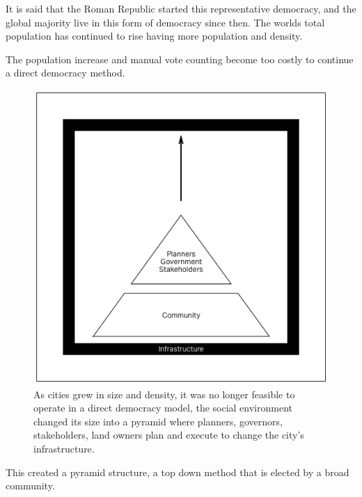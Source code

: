 
It is said that the Roman Republic started this representative
democracy, and the global majority live in this form of democracy
since then. The worlds total population has continued to rise having
more population and density.

The population increase and manual vote counting become too costly to continue a direct democracy method.

\begin{figure}[!htb]
  \includegraphics[width=\textwidth]{chapters/2/fig/representative.png}               
  \caption[representative democracy]{As cities grew in size and density, it
    was no longer feasible to operate in a direct democracy model, the social
    environment changed its size into a pyramid where planners, governors,
  stakeholders, land owners plan and execute to change the city's infrastructure.}
  \label{fig:diagarm_representative}
\end{figure}

This created a pyramid structure, a top down method that is elected by a
broad community.


